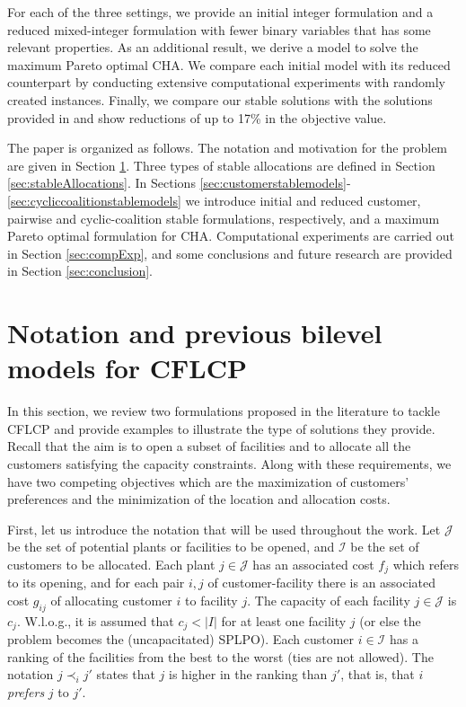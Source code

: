 \documentclass[preprint,11pt,authoryear]{elsarticle}
\def\J{\mathcal{J}}
\def\I{\mathcal{I}}
\begin{document}
For each of the three settings, we provide an initial integer formulation and a reduced mixed-integer formulation with fewer binary variables that has some relevant properties. As an additional result, we derive a model to solve the maximum Pareto optimal CHA. We compare each initial model with its reduced counterpart by conducting extensive computational experiments with randomly created instances. Finally, we compare our stable solutions with the solutions provided in \cite{calvete2020} and show reductions of up to 17\% in the objective value. 

The paper is organized as follows. The notation and motivation for the problem are given in Section \ref{sec:motivation}. Three types of stable allocations are defined in Section \ref{sec:stableAllocations}. In Sections \ref{sec:customerstablemodels}-\ref{sec:cycliccoalitionstablemodels} we introduce initial and reduced customer, pairwise and cyclic-coalition stable formulations, respectively, and a maximum Pareto optimal formulation for CHA. Computational experiments are carried out in Section \ref{sec:compExp}, and some conclusions and future research are provided in Section \ref{sec:conclusion}.


\section{Notation and previous bilevel models for CFLCP} \label{sec:motivation}

In this section, we review two formulations proposed in the literature to tackle CFLCP and provide examples to illustrate the type of solutions they provide. Recall that the aim is to open a subset of facilities and to allocate all the customers satisfying the capacity constraints. Along with these requirements, we have two competing objectives which are the maximization of customers' preferences and the minimization of the location and allocation costs.

First, let us introduce the notation that will be used throughout the work. Let $\J$ be the set of potential plants or facilities to be opened, and $\I$ be the set of customers to be allocated. Each plant $j\in \J$ has an associated cost $f_j$ which refers to its opening, and for each pair $i,j$ of customer-facility there is an associated cost $g_{ij}$ of allocating customer $i$ to facility $j$. The capacity of each facility $j\in \J$ is $c_j$. W.l.o.g., it is assumed that $c_j < |I|$ for at least one facility $j$ (or else the problem becomes the (uncapacitated) SPLPO). Each customer $i\in \I$ has a ranking of the facilities from the best to the worst (ties are not allowed). The notation $j\prec_i j'$ states that $j$ is higher in the ranking than $j'$, that is, that $i$ \textit{prefers} $j$ to $j'$.%
\end{document}
